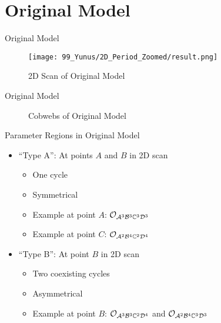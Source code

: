 
\section{Original Model}

\begin{frame}{Original Model}
	\begin{figure}
		\centering
		\texttt{[image: 99\_Yunus/2D\_Period\_Zoomed/result.png]}
		\caption{2D Scan of Original Model}
	\end{figure}
\end{frame}

\begin{frame}{Original Model}
	\vspace{-3.0em}
	\begin{figure}
		\centering
		\caption{Cobwebs of Original Model}
	\end{figure}
\end{frame}

\begin{frame}{Parameter Regions in Original Model}
	\begin{itemize}
		\item ``Type A'': At points $A$ and $B$ in 2D scan
		      \begin{itemize}
			      \item One cycle
			      \item Symmetrical
			      \item Example at point $A$: $\mathcal{O}_{\mathcal{A}^3\mathcal{B}^3\mathbb{C}^3\mathcal{D}^3}$
			      \item Example at point $C$: $\mathcal{O}_{\mathcal{A}^2\mathcal{B}^4\mathbb{C}^2\mathcal{D}^4}$ \vspace*{1em}
		      \end{itemize}
		\item ``Type B'': At point $B$ in 2D scan
		      \begin{itemize}
			      \item Two coexisting cycles
			      \item Asymmetrical
			      \item Example at point $B$: $\mathcal{O}_{\mathcal{A}^3\mathcal{B}^3\mathbb{C}^2\mathcal{D}^4}$ and $\mathcal{O}_{\mathcal{A}^2\mathcal{B}^4\mathbb{C}^3\mathcal{D}^3}$
		      \end{itemize}
	\end{itemize}
\end{frame}

